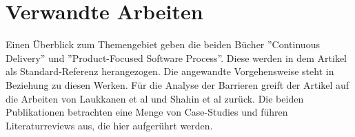 \section{Verwandte Arbeiten}
Einen Überblick zum Themengebiet geben die beiden Bücher ''Continuous Delivery''\cite{Wolff.2016} und ''Product-Focused Software Process''\cite{Jedlitschka.2014}. Diese werden in dem Artikel als Standard-Referenz herangezogen. Die angewandte Vorgehensweise steht in Beziehung zu diesen Werken. Für die Analyse der Barrieren greift der Artikel auf die Arbeiten von Laukkanen et al\cite{Laukkanen.2017} und Shahin et al\cite{Shahin.2017} zurück. Die beiden Publikationen betrachten eine Menge von Case-Studies und führen Literaturreviews aus, die hier aufgerührt werden.

 


  
